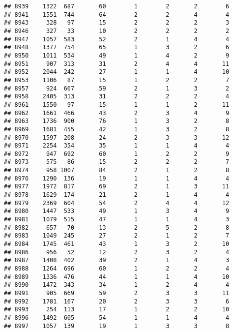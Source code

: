 \documentclass[]{article}
\begin{document}
\begin{verbatim}
## 8939    1322  687       60        1        2       2        6
## 8941    1551  744       64        2        2       4        4
## 8943     328   97       15        2        2       2        3
## 8946     327   33       10        2        2       2        2
## 8947    1057  583       52        2        1       4        4
## 8948    1377  754       65        1        3       2        6
## 8950    1011  534       49        1        4       2        9
## 8951     907  313       31        2        4       4       11
## 8952    2044  242       27        1        1       4       10
## 8953    1106   87       15        1        2       2        7
## 8957     924  667       59        2        1       3        2
## 8958    2405  313       31        2        2       2        4
## 8961    1550   97       15        1        1       2       11
## 8962    1661  466       43        2        3       4        9
## 8963    1736  900       76        1        3       2        8
## 8969    1681  455       42        1        3       2        8
## 8970    1597  208       24        2        3       3       12
## 8971    2254  354       35        1        1       4        4
## 8972     947  692       60        1        2       2        9
## 8973     575   86       15        2        2       2        7
## 8974     958 1007       84        2        1       2        8
## 8976    1290  136       19        1        1       4        4
## 8977    1972  817       69        2        1       3       11
## 8978    1629  174       21        2        1       4        4
## 8979    2369  604       54        2        4       4       12
## 8980    1447  533       49        1        3       4        9
## 8981    1079  515       47        1        1       4        3
## 8982     657   70       13        2        5       2        8
## 8983    1049  245       27        2        1       2        7
## 8984    1745  461       43        1        3       2       10
## 8986     956   52       12        2        3       2        4
## 8987    1408  402       39        2        1       4        3
## 8988    1264  696       60        1        2       2        4
## 8989    1336  476       44        1        1       4       10
## 8990    1472  343       34        1        2       4        4
## 8991     905  669       59        2        3       3       11
## 8992    1781  167       20        2        3       3        6
## 8993     254  113       17        1        2       2       10
## 8996    1492  605       54        1        1       4        4
## 8997    1057  139       19        1        3       3        8

\end{verbatim}
\end{document}
